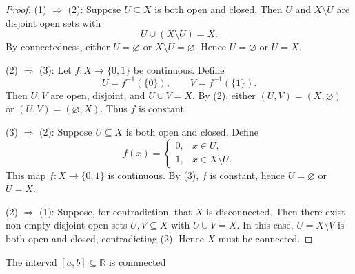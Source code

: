 \begin{proof}
\noindent (1) $\Rightarrow$ (2):  
Suppose \(U \subseteq X\) is both open and closed. Then \(U\) and \(X \setminus U\) are disjoint open sets with 
\[
U \cup (X \setminus U) = X.
\]
By connectedness, either \(U = \varnothing\) or \(X \setminus U = \varnothing\). Hence \(U = \varnothing\) or \(U = X\).

\medskip

\noindent (2) $\Rightarrow$ (3):  
Let \(f : X \to \{0,1\}\) be continuous. Define
\[
U = f^{-1}(\{0\}), \qquad V = f^{-1}(\{1\}).
\]
Then \(U,V\) are open, disjoint, and \(U \cup V = X\). By (2), either \((U,V) = (X,\varnothing)\) or \((U,V) = (\varnothing,X)\). Thus \(f\) is constant.

\medskip

\noindent (3) $\Rightarrow$ (2):  
Suppose \(U \subseteq X\) is both open and closed. Define
\[
f(x) =
\begin{cases}
0, & x \in U, \\
1, & x \in X \setminus U.
\end{cases}
\]
This map \(f : X \to \{0,1\}\) is continuous. By (3), \(f\) is constant, hence \(U = \varnothing\) or \(U = X\).

\medskip

\noindent (2) $\Rightarrow$ (1):  
Suppose, for contradiction, that \(X\) is disconnected. Then there exist non-empty disjoint open sets \(U,V \subseteq X\) with \(U \cup V = X\). In this case, \(U = X \setminus V\) is both open and closed, contradicting (2). Hence \(X\) must be connected.
\end{proof}

\begin{corollary}
    The interval \(\left\lbrack  {a,b}\right\rbrack   \subseteq  \mathbb{R}\) is connnected
\end{corollary}

